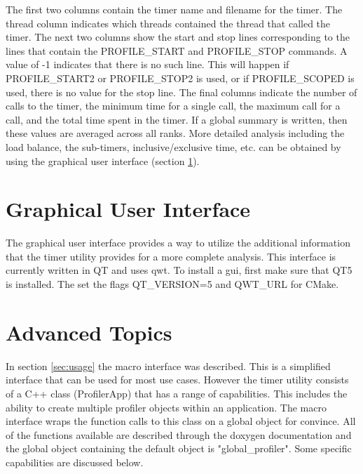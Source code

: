 \documentclass[fleqn,10pt,letterpaper]{article}
\begin{document}
The first two columns contain the timer name and filename for the timer.  
The thread column indicates which threads contained the thread that called the timer.
The next two columns show the start and stop lines corresponding to the lines that
contain the PROFILE\_START and PROFILE\_STOP commands.  A value of -1 indicates that
there is no such line.  This will happen if PROFILE\_START2 or PROFILE\_STOP2 is used,
or if PROFILE\_SCOPED is used, there is no value for the stop line.  
The final columns indicate the number of calls to the timer, the minimum time for a
single call, the maximum call for a call, and the total time spent in the timer.  
If a global summary is written, then these values are averaged across all ranks.  
More detailed analysis including the load balance, the sub-timers, inclusive/exclusive
time, etc. can be obtained by using the graphical user interface (section \ref{sec:gui}).  



\section{Graphical User Interface}  \label{sec:gui}

The graphical user interface provides a way to utilize the additional information
that the timer utility provides for a more complete analysis.  This interface 
is currently written in QT and uses qwt.  To install a gui, first make sure that QT5
is installed.  The set the flags QT_VERSION=5 and QWT_URL for CMake.


\section{Advanced Topics}  \label{sec:advanced}

In section \ref{sec:usage} the macro interface was described.  This is a simplified
interface that can be used for most use cases.  However the timer utility consists
of a C++ class (ProfilerApp) that has a range of capabilities.  This includes the
ability to create multiple profiler objects within an application.  The macro interface
wraps the function calls to this class on a global object for convince.  All of 
the functions available are described through the doxygen documentation and the global
object containing the default object is "global\_profiler".  Some specific capabilities 
are discussed below.
\end{document}

